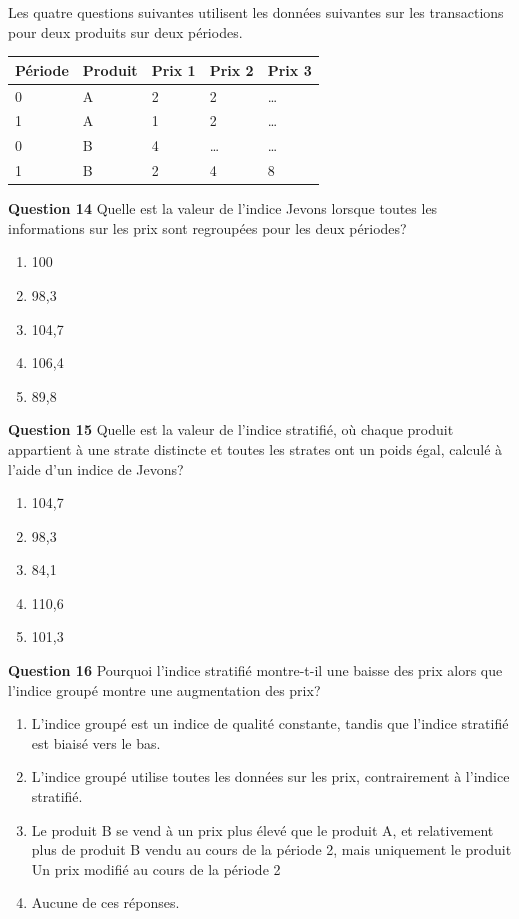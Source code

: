 \documentclass[]{article}
\begin{document}
Les quatre questions suivantes utilisent les données suivantes sur les transactions pour deux produits sur deux périodes.

\begin{longtable}[]{@{}lllll@{}}
\toprule
Période & Produit & Prix 1 & Prix 2 & Prix 3\tabularnewline
\midrule
\endhead
0 & A & 2 & 2 & \ldots{}\tabularnewline
1 & A & 1 & 2 & \ldots{}\tabularnewline
0 & B & 4 & \ldots{} & \ldots{}\tabularnewline
1 & B & 2 & 4 & 8\tabularnewline
\bottomrule
\end{longtable}

\textbf{Question 14} Quelle est la valeur de l'indice Jevons lorsque toutes les informations sur les prix sont regroupées pour les deux périodes?

\begin{enumerate}
\def\labelenumi{\alph{enumi})}
\item
  100
\item
  98,3
\item
  104,7
\item
  106,4
\item
  89,8
\end{enumerate}

\textbf{Question 15} Quelle est la valeur de l'indice stratifié, où chaque produit appartient à une strate distincte et toutes les strates ont un poids égal, calculé à l'aide d'un indice de Jevons?

\begin{enumerate}
\def\labelenumi{\alph{enumi})}
\item
  104,7
\item
  98,3
\item
  84,1
\item
  110,6
\item
  101,3
\end{enumerate}

\textbf{Question 16} Pourquoi l'indice stratifié montre-t-il une baisse des prix alors que l'indice groupé montre une augmentation des prix?

\begin{enumerate}
\def\labelenumi{\alph{enumi})}
\item
  L'indice groupé est un indice de qualité constante, tandis que l'indice stratifié est biaisé
  vers le bas.
\item
  L'indice groupé utilise toutes les données sur les prix, contrairement à l'indice stratifié.
\item
  Le produit B se vend à un prix plus élevé que le produit A, et relativement plus de produit B
  vendu au cours de la période 2, mais uniquement le produit Un prix modifié au cours de la période 2
\item
  Aucune de ces réponses.
\end{enumerate}
\end{document}
